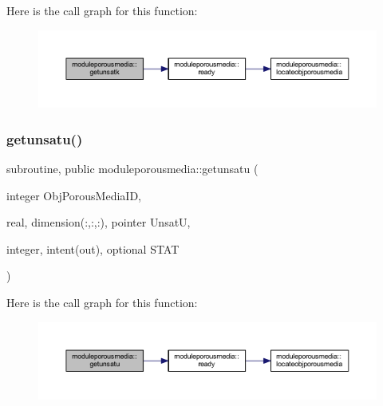 Here is the call graph for this function\+:\nopagebreak
\begin{figure}[H]
\begin{center}
\leavevmode
\includegraphics[width=350pt]{namespacemoduleporousmedia_a8bdcde0305ffa37c3f25774f880927af_cgraph}
\end{center}
\end{figure}
\mbox{\label{namespacemoduleporousmedia_a4a8574c685ff8e68510803b38c3821ad}} 
\subsubsection{\texorpdfstring{getunsatu()}{getunsatu()}}
{\footnotesize\ttfamily subroutine, public moduleporousmedia\+::getunsatu (\begin{DoxyParamCaption}\item[{integer}]{Obj\+Porous\+Media\+ID,  }\item[{real, dimension(\+:,\+:,\+:), pointer}]{UnsatU,  }\item[{integer, intent(out), optional}]{S\+T\+AT }\end{DoxyParamCaption})}

Here is the call graph for this function\+:\nopagebreak
\begin{figure}[H]
\begin{center}
\leavevmode
\includegraphics[width=350pt]{namespacemoduleporousmedia_a4a8574c685ff8e68510803b38c3821ad_cgraph}
\end{center}
\end{figure}
\mbox{\label{namespacemoduleporousmedia_ae1e42504208d748be9b82e97810025bf}} 
